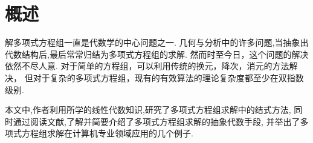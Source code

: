 \section{概述}
	解多项式方程组一直是代数学的中心问题之一.
	几何与分析中的许多问题,当抽象出代数结构后,最后常常归结为多项式方程组的求解.
	然而时至今日，这个问题的解决依然不尽人意.
	对于简单的方程组，可以利用传统的换元，降次，消元的方法解决，
	但对于复杂的多项式方程组，现有的有效算法的理论复杂度都至少在双指数级别.

	本文中,作者利用所学的线性代数知识,研究了多项式方程组求解中的结式方法,
	同时通过阅读文献,了解并简要介绍了多项式方程组求解的抽象代数手段,
	并举出了多项式方程组求解在计算机专业领域应用的几个例子.
	
